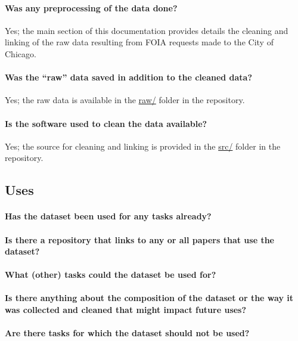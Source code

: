 \paragraph{Was any preprocessing of the data done?}
Yes; the main section of this documentation provides details the cleaning and linking of the raw
data resulting from FOIA requests made to the City of Chicago.

\paragraph{Was the ``raw'' data saved in addition to the cleaned data?}
Yes; the raw data is available in the \url{raw/} folder in the repository.

\paragraph{Is the software used to clean the data available?}
Yes; the source for cleaning and linking is provided in the \url{src/} folder in the repository.

\subsection{Uses}

\paragraph{Has the dataset been used for any tasks already?}

\paragraph{Is there a repository that links to any or all papers that use the dataset?}

\paragraph{What (other) tasks could the dataset be used for?}

\paragraph{Is there anything about the composition of the dataset or the way it was collected and cleaned that might impact future uses?}

\paragraph{Are there tasks for which the dataset should not be used?}

